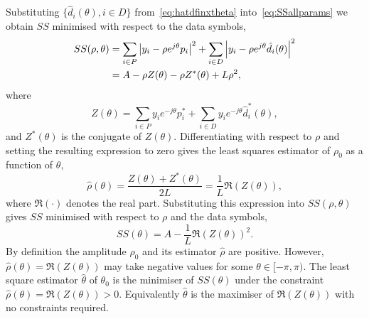 \documentclass[draftcls, onecolumn, 11pt]{IEEEtran}
\begin{document}
Substituting $\{ \hat{d}_i(\theta), i \in D \}$ from~\eqref{eq:hatdfinxtheta} into~\eqref{eq:SSallparams} we obtain $SS$ minimised with respect to the data symbols,
 \begin{align*}
SS(\rho, \theta) &=\sum_{i \in P} {\left\vert  y_i - \rho e^{j\theta} p_i  \right\vert}^2 + \sum_{i \in D} {\left\vert  y_i - \rho e^{j\theta} \hat{d_i}(\theta)  \right\vert}^2 \\
&= A - \rho Z(\theta) - \rho Z^*(\theta) + L \rho^2,
\end{align*}
where
\[
Z(\theta)  = \sum_{i \in P} y_i e^{-j\theta} p_i^* + \sum_{i \in D} y_i e^{-j\theta} \hat{d}_i^*(\theta),
\]
and $Z^*(\theta)$ is the conjugate of $Z(\theta)$.  Differentiating with respect to $\rho$ and setting the resulting expression to zero gives the least squares estimator of $\rho_0$ as a function of $\theta$,
\begin{equation}\label{eq:hatrhoZ}
\hat{\rho}(\theta) = \frac{Z(\theta) + Z^*(\theta)}{2L} = \frac{1}{L}\Re(Z(\theta)),
\end{equation}
where $\Re(\cdot)$ denotes the real part.  %
Substituting this expression into $SS(\rho, \theta)$ gives $SS$ minimised with respect to $\rho$ and the data symbols,
\[
SS(\theta) = A - \frac{1}{L}\Re(Z(\theta))^2.
\]
By definition the amplitude $\rho_0$ and its estimator $\hat{\rho}$ are positive.  However, $\hat{\rho}(\theta) = \Re(Z(\theta))$ may take negative values for some $\theta \in [-\pi,\pi)$.  %
The least square estimator $\hat{\theta}$ of $\theta_0$ is the minimiser of $SS(\theta)$ under the constraint $\hat{\rho}(\theta) = \Re(Z(\theta)) > 0$.  Equivalently $\hat{\theta}$ is the maximiser of $\Re(Z(\theta))$ with no constraints required.
 
\end{document}
